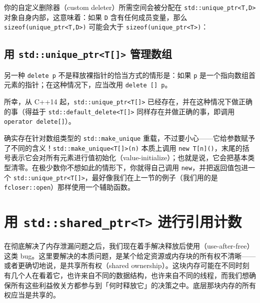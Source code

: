 你的自定义删除器（custom deleter）所需空间会被分配在 \texttt{std::\allowbreak{}unique\_\allowbreak{}ptr<\allowbreak{}T,\allowbreak{}D>\allowbreak{}} 对象自身内部，这意味着：如果 \texttt{D} 含有任何成员变量，那么 \texttt{sizeof(\allowbreak{}unique\_\allowbreak{}ptr<\allowbreak{}T,\allowbreak{}D>\allowbreak{})\allowbreak{}} 可能会大于 \texttt{sizeof(\allowbreak{}unique\_\allowbreak{}ptr<\allowbreak{}T>\allowbreak{})\allowbreak{}}：


\subsection{用 \texttt{std::\allowbreak{}unique\_\allowbreak{}ptr<\allowbreak{}T[]>} 管理数组}

另一种 \texttt{delete p} 不是释放裸指针的恰当方式的情形是：如果 \texttt{p} 是一个指向数组首元素的指针；在这种情况下，应当改用 \texttt{delete [] p}。

所幸，从 C++14 起，\texttt{std::\allowbreak{}unique\_\allowbreak{}ptr<\allowbreak{}T[]>} 已经存在，并在这种情况下做正确的事（得益于 \texttt{std::\allowbreak{}default\_\allowbreak{}delete<\allowbreak{}T[]>} 同样存在并做正确的事，即调用 \texttt{operator delete[]}）。

确实存在针对数组类型的 \texttt{std::\allowbreak{}make\_\allowbreak{}unique} 重载，不过要小心——它给参数赋予了不同的含义！\texttt{std::\allowbreak{}make\_\allowbreak{}unique<\allowbreak{}T[]>(\allowbreak{}n)\allowbreak{}} 本质上调用 \texttt{new T[n](\allowbreak{})\allowbreak{}}，末尾的括号表示它会对所有元素进行值初始化（value-initialize）；也就是说，它会把基本类型清零。在极少数你不想如此的情形下，你就得自己调用 \texttt{new}，并把返回值包进一个 \texttt{std::\allowbreak{}unique\_\allowbreak{}ptr<\allowbreak{}T[]>}，最好像我们在上一节的例子（我们用的是 \texttt{fcloser::\allowbreak{}open}）那样使用一个辅助函数。

\section{用 \texttt{std::\allowbreak{}shared\_\allowbreak{}ptr<\allowbreak{}T>\allowbreak{}} 进行引用计数}

在彻底解决了内存泄漏问题之后，我们现在着手解决释放后使用（use-after-free）这类 bug。这里要解决的本质问题，是某个给定资源或内存块的所有权不清晰——或者更确切地说，是共享所有权（shared ownership）。这块内存可能在不同时刻有几个人在看着它，也许来自不同的数据结构，也许来自不同的线程，而我们想确保所有这些利益攸关方都参与到「何时释放它」的决策之中。底层那块内存的所有权应当是共享的。


